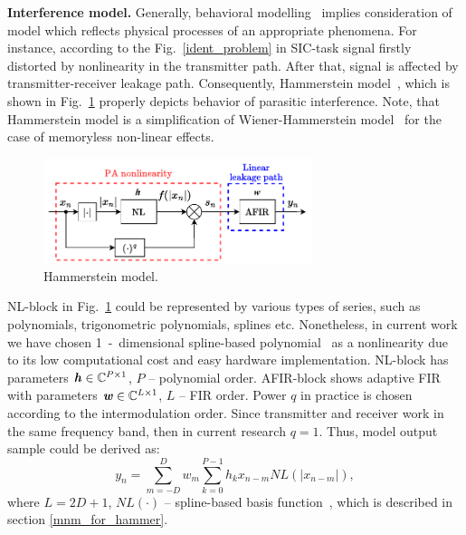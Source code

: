 \documentclass[12pt]{article}
\newcommand{\bit}[1]{\ensuremath{\textbf{\textit{#1}}}}
\begin{document}
\textbf{Interference model.}
Generally, behavioral modelling~\cite{behav_model} implies consideration of model which reflects physical processes of an appropriate phenomena. For instance, according to the Fig.~\ref{ident_problem} in SIC-task signal firstly distorted by nonlinearity in the transmitter path. After that, signal is affected by transmitter-receiver leakage path. Consequently, Hammerstein model~\cite{behav_model}, which is shown in Fig.~\ref{hammerstein_model} properly depicts behavior of parasitic interference. Note, that Hammerstein model is a simplification of Wiener-Hammerstein model~\cite{behav_model} for the case of memoryless non-linear effects.
\begin{figure}[h!]
\centerline{\includegraphics[width = 0.7\textwidth]{figures/hammerstein/hammerstein.pdf}}
\caption{Hammerstein model.}
\label{hammerstein_model}
\end{figure}
NL-block in Fig.~\ref{hammerstein_model} could be represented by various types of series, such as polynomials, trigonometric polynomials, splines etc. Nonetheless, in current work we have chosen 1~-~dimensional spline-based polynomial~\cite{lut_dpd} as a nonlinearity due to its low computational cost and easy hardware implementation. NL-block has parameters $\bit{h}\in\mathbb{C}^{P\times 1}$, $P$ -- polynomial order. AFIR-block shows adaptive FIR~\cite{haykin} with parameters $\bit{w}\in\mathbb{C}^{L\times 1}$, $L$ -- FIR order. Power $q$ in practice is chosen according to the intermodulation order. Since transmitter and receiver work in the same frequency band, then in current research $q=1$. Thus, model output sample could be derived as:
\begin{equation}
    y_n=\sum_{m=-D}^{D}w_m\sum_{k=0}^{P-1}h_k x_{n-m}NL(|x_{n-m}|),
    \label{hammerstein_output}
\end{equation}
where $L=2D+1$, $NL(\cdot)$ -- spline-based basis function~\cite{lut_dpd}, which is described in section \ref{mnm_for_hammer}.

\end{document}

